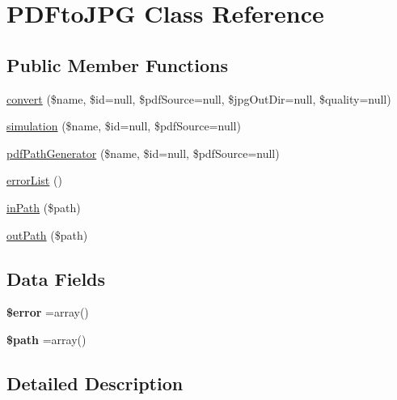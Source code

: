 \hypertarget{class_p_d_fto_j_p_g}{\section{P\-D\-Fto\-J\-P\-G Class Reference}
\label{class_p_d_fto_j_p_g}
}
\subsection*{Public Member Functions}
\begin{DoxyCompactItemize}
\item 
\hyperlink{class_p_d_fto_j_p_g_ac4a417ed69f33e594ad12eceb846174c}{convert} (\$name, \$id=null, \$pdf\-Source=null, \$jpg\-Out\-Dir=null, \$quality=null)
\item 
\hyperlink{class_p_d_fto_j_p_g_aae3bfc864c34fb7c89abfbb0cbd5b296}{simulation} (\$name, \$id=null, \$pdf\-Source=null)
\item 
\hyperlink{class_p_d_fto_j_p_g_aa0a676d0c993727b170c6f7382d113d8}{pdf\-Path\-Generator} (\$name, \$id=null, \$pdf\-Source=null)
\item 
\hyperlink{class_p_d_fto_j_p_g_aa4659cafa5751c6ad17aabc467ad7958}{error\-List} ()
\item 
\hyperlink{class_p_d_fto_j_p_g_a33a69510fb3e90f4f6064ca10d47fc84}{in\-Path} (\$path)
\item 
\hyperlink{class_p_d_fto_j_p_g_a95fe4c5f4fb9d95bf52451a457870db9}{out\-Path} (\$path)
\end{DoxyCompactItemize}
\subsection*{Data Fields}
\begin{DoxyCompactItemize}
\item 
\hypertarget{class_p_d_fto_j_p_g_aeba2ab722cedda53dbb7ec1a59f45550}{{\bfseries \$error} =array()}\label{class_p_d_fto_j_p_g_aeba2ab722cedda53dbb7ec1a59f45550}

\item 
\hypertarget{class_p_d_fto_j_p_g_a0a4baf0b22973c07685c3981f0d17fc4}{{\bfseries \$path} =array()}\label{class_p_d_fto_j_p_g_a0a4baf0b22973c07685c3981f0d17fc4}

\end{DoxyCompactItemize}


\subsection{Detailed Description}


